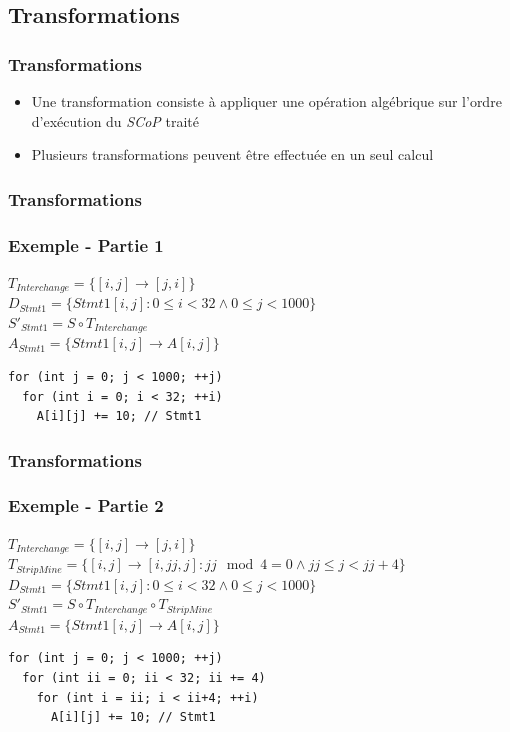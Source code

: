 \documentclass{beamer}
\begin{document}
\subsection{Transformations}
\begin{frame}
\frametitle{Transformations}
\begin{itemize}
\item Une transformation consiste à appliquer une opération algébrique sur l'ordre d'exécution du \textit{SCoP} traité
\item Plusieurs transformations peuvent être effectuée en un seul calcul
\end{itemize}
\end{frame}

\begin{frame}[fragile]
\frametitle{Transformations}
\frametitle{Exemple - Partie 1}
$T_{Interchange} = \{[i,j] \rightarrow [j,i] \}$\\
\vspace{0.5cm}
$D_{Stmt1} = \{Stmt1[i,j]: 0 \leq i < 32 \wedge 0 \leq j < 1000 \}$\\
$S'_{Stmt1} = S \circ T_{Interchange}$\\
$A_{Stmt1} = \{Stmt1[i,j] \rightarrow A[i,j] \}$\\
\vspace{0.5cm}
\begin{lstlisting}
for (int j = 0; j < 1000; ++j)
  for (int i = 0; i < 32; ++i)
    A[i][j] += 10; // Stmt1
\end{lstlisting}
\end{frame}

\begin{frame}[fragile]
\frametitle{Transformations}
\frametitle{Exemple - Partie 2}
$T_{Interchange} = \{[i,j] \rightarrow [j,i] \}$\\
$T_{StripMine} = \{[i,j] \rightarrow [i,jj,j]: jj \mod 4 = 0 \wedge jj \leq j < jj + 4 \}$\\
\vspace{0.5cm}
$D_{Stmt1} = \{Stmt1[i,j]: 0 \leq i < 32 \wedge 0 \leq j < 1000 \}$\\
$S'_{Stmt1} = S \circ T_{Interchange} \circ T_{StripMine}$\\
$A_{Stmt1} = \{Stmt1[i,j] \rightarrow A[i,j] \}$\\
\vspace{0.5cm}
\begin{lstlisting}
for (int j = 0; j < 1000; ++j)
  for (int ii = 0; ii < 32; ii += 4)
    for (int i = ii; i < ii+4; ++i)
      A[i][j] += 10; // Stmt1
\end{lstlisting}
\end{frame}
\end{document}
